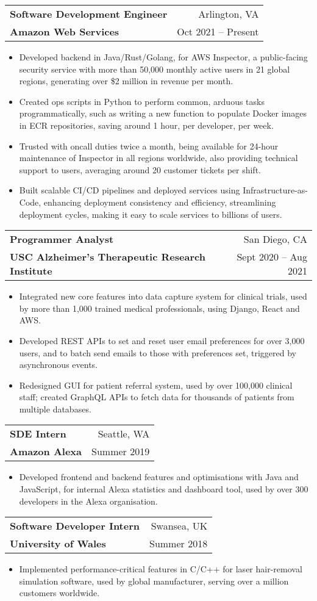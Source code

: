 \documentclass[letterpaper,11pt]{article}
\makeatletter
\newcommand{\resumeSubheading}[4]{
  \vspace{-1pt}\item
    \begin{tabular*}{0.98\textwidth}[t]{l@{\extracolsep{\fill}}r}
      \textbf{#1} & #2 \\
      {\small#3} & {\small #4} \\
    \end{tabular*}\vspace{-5pt}
}
\newcommand{\resumeItemListStart}{\begin{itemize}[leftmargin=*]}
\newcommand{\resumeItemListEnd}{\end{itemize}\vspace{-5pt}}
\makeatother
\begin{document}
\resumeSubheading
  {Software Development Engineer}{Arlington, VA}
  {\textbf{Amazon Web Services}}{Oct 2021 -- Present}
    \resumeItemListStart
      \item {Developed backend in Java/Rust/Golang, for AWS Inspector, a public-facing security service with more than
50,000 monthly active users in 21 global regions, generating over \$2 million in revenue per month.}
      \item {Created ops scripts in Python to perform common, arduous tasks programmatically, such as writing a new
function to populate Docker images in ECR repositories, saving around 1 hour, per developer, per week.}
      \item {Trusted with oncall duties twice a month, being available for 24-hour maintenance of Inspector in all regions
worldwide, also providing technical support to users, averaging around 20 customer tickets per shift.}
      \item {Built scalable CI/CD pipelines and deployed services using Infrastructure-as-Code, enhancing deployment consistency and efficiency, streamlining deployment cycles, making it easy to scale services to billions of users.}
    \resumeItemListEnd

\resumeSubheading
  {Programmer Analyst}{San Diego, CA}
  {\textbf{USC Alzheimer’s Therapeutic Research Institute}}{Sept 2020 -- Aug 2021}
    \resumeItemListStart
      \item {Integrated new core features into data capture system for clinical trials, used by more than 1,000 trained medical professionals, using Django, React and AWS.}
      \item {Developed REST APIs to set and reset user email preferences for over 3,000 users, and to batch send emails
to those with preferences set, triggered by asynchronous events.}
      \item {Redesigned GUI for patient referral system, used by over 100,000 clinical staff; created GraphQL APIs to
fetch data for thousands of patients from multiple databases.}
    \resumeItemListEnd

\resumeSubheading
  {SDE Intern}{Seattle, WA}
  {\textbf{Amazon Alexa}}{Summer 2019}
    \resumeItemListStart
      \item {Developed frontend and backend features and optimisations with Java and JavaScript, for internal Alexa statistics and dashboard tool, used by over 300 developers in the Alexa organisation.}
    \resumeItemListEnd

\resumeSubheading
  {Software Developer Intern}{Swansea, UK}
  {\textbf{University of Wales}}{Summer 2018}
    \resumeItemListStart
      \item {Implemented performance-critical features in C/C++ for laser hair-removal simulation software, used by global manufacturer, serving over a million customers worldwide.}
    \resumeItemListEnd
\end{document}

